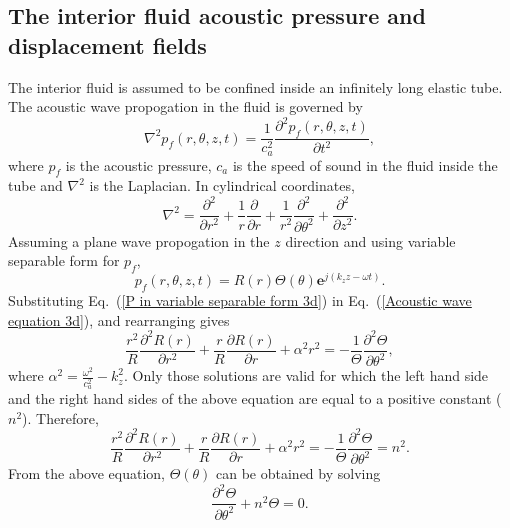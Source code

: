 \documentclass[twocolumn,10pt]{asme2ej}
\begin{document}
\subsection{The interior fluid acoustic pressure and displacement fields}\label{inside fluid modelling}
The interior fluid is assumed to be confined inside an infinitely long elastic tube. The acoustic wave propogation in the fluid is governed by
\begin{equation}\label{Acoustic wave equation 3d}
    \nabla^{2}p_f(r,\theta,z,t) = \frac{1}{c_a^{2}}\frac{\partial^{2} p_f(r,\theta,z,t)}{\partial t^{2}},
\end{equation}
where $p_{f}$ is the acoustic pressure, $c_a$ is the speed of sound in the fluid inside the tube and $\nabla^2$ is the Laplacian. In cylindrical coordinates,
\begin{equation}
    \nabla^2 = \frac{\partial^2}{\partial r^2} + \frac{1}{r}\frac{\partial}{\partial r} + \frac{1}{r^2}\frac{\partial^2}{\partial \theta^2} + \frac{\partial^2}{\partial z^2}.
\end{equation}
Assuming a plane wave propogation in the $z$ direction and using variable separable form for $p_f$,
\begin{equation}\label{P in variable separable form 3d}
    p_{f}(r,\theta,z,t) = R(r)\Theta(\theta) \mathbf{e}^{j(k_{z}z-\omega t)}.
\end{equation}
Substituting Eq.~(\ref{P in variable separable form 3d}) in Eq.~(\ref{Acoustic wave equation 3d}), and rearranging gives 
\begin{equation}
    \frac{r^2}{R}\frac{\partial^{2}R(r)}{\partial r^{2}} + \frac{r}{R}\frac{\partial R(r)}{\partial r} + \alpha^2 r^2 = -\frac{1}{\Theta}\frac{\partial^2 \Theta}{\partial \theta^2},
\end{equation}
where $\alpha^2 = \frac{\omega^{2}}{c_{a}^{2}} - k_{z}^{2}$. Only those solutions are valid for which the left hand side and the right hand sides of the above equation are equal to a positive constant ($n^2$). Therefore,
\begin{equation}\label{LHS RHS}
    \frac{r^2}{R}\frac{\partial^{2}R(r)}{\partial r^{2}} + \frac{r}{R}\frac{\partial R(r)}{\partial r} + \alpha^2 r^2 = -\frac{1}{\Theta}\frac{\partial^2 \Theta}{\partial \theta^2} = n^2.
\end{equation}
From the above equation, $\Theta(\theta)$ can be obtained by solving
\begin{equation}\label{theta governing eqn inside fluid}
    \frac{\partial^2 \Theta}{\partial \theta^2} + n^2\Theta = 0.
\end{equation}
\end{document}
